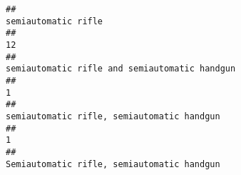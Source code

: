 \documentclass[
]{article}
\begin{document}
\begin{verbatim}
##                                                                                                                                                                                                                                                                                                                                                                                   semiautomatic rifle 
##                                                                                                                                                                                                                                                                                                                                                                                                    12 
##                                                                                                                                                                                                                                                                                                                                                         semiautomatic rifle and semiautomatic handgun 
##                                                                                                                                                                                                                                                                                                                                                                                                     1 
##                                                                                                                                                                                                                                                                                                                                                            semiautomatic rifle, semiautomatic handgun 
##                                                                                                                                                                                                                                                                                                                                                                                                     1 
##                                                                                                                                                                                                                                                                                                                                                            Semiautomatic rifle, semiautomatic handgun 

\end{verbatim}
\end{document}
